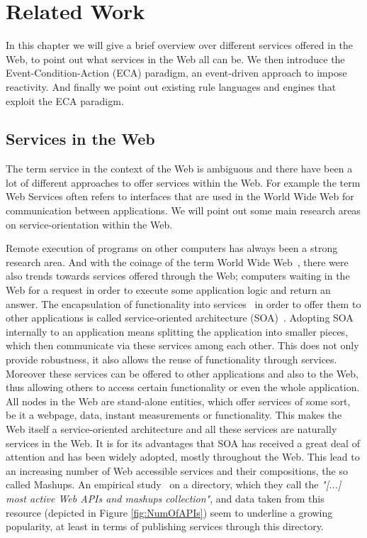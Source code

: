 
\chapter{Related Work}

In this chapter we will give a brief overview over different services offered in the Web, to point out what services in the Web all can be.
We then introduce the Event-Condition-Action (\textrm{ECA}) paradigm, an event-driven approach to impose reactivity.
And finally we point out existing rule languages and engines that exploit the \textrm{ECA} paradigm.



\section{Services in the Web}
The term service in the context of the Web is ambiguous and there have been a lot of different approaches to offer services within the Web.
For example the term \textrm{Web Services} often refers to interfaces that are used in the \textrm{World Wide Web} for communication between applications.
We will point out some main research areas on service-orientation within the Web.

Remote execution of programs on other computers has always been a strong research area. And with the coinage of the term \textrm{World Wide Web}~\cite{DBLP:journals/en/Berners-LeeCGP92}, there were also trends towards services offered through the Web; computers waiting in the Web for a request in order to execute some application logic and return an answer.
The encapsulation of functionality into services~\cite{peltz2003web} in order to offer them to other applications is called service-oriented architecture (\textrm{SOA})~\cite{perrey2003service}.
Adopting \textrm{SOA} internally to an application means splitting the application into smaller pieces, which then communicate via these services among each other.
This does not only provide robustness, it also allows the reuse of functionality through services.
Moreover these services can be offered to other applications and also to the Web, thus allowing others to access certain functionality or even the whole application.
All nodes in the Web are stand-alone entities, which offer services of some sort, be it a webpage, data, instant measurements or functionality.
This makes the Web itself a service-oriented architecture and all these services are naturally services in the Web.
It is for its advantages that \textrm{SOA} has received a great deal of attention and has been widely adopted, mostly throughout the Web.
This lead to an increasing number of Web accessible services and their compositions, the so called \textrm{Mashups}.
An empirical study~\cite{conf/icws/HuangFT12} on a directory, which they call the \textit{"[...] most active Web APIs and mashups collection"}, and data taken from this resource (depicted in Figure \ref{fig:NumOfAPIs}) seem to underline a growing popularity, at least in terms of publishing services through this directory.

